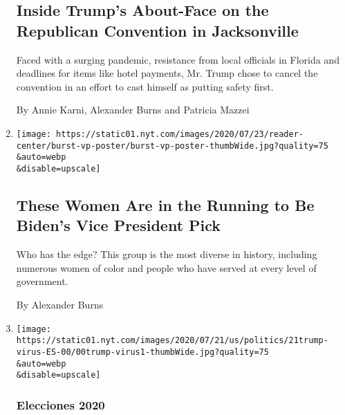 \begin{enumerate}
  \hypertarget{inside-trumps-about-face-on-the-republican-convention-in-jacksonville}{%
  \subsection{Inside Trump's About-Face on the Republican Convention in
  Jacksonville}\label{inside-trumps-about-face-on-the-republican-convention-in-jacksonville}}

  Faced with a surging pandemic, resistance from local officials in
  Florida and deadlines for items like hotel payments, Mr. Trump chose
  to cancel the convention in an effort to cast himself as putting
  safety first.

  By Annie Karni, Alexander Burns and Patricia Mazzei
\item
  \href{/interactive/2020/07/23/us/elections/vice-president-biden-kamala-harris-elizabeth-warren.html}{}

  \texttt{[image: https://static01.nyt.com/images/2020/07/23/reader-center/burst-vp-poster/burst-vp-poster-thumbWide.jpg?quality=75\\\&auto=webp\\\&disable=upscale]}

  \hypertarget{these-women-are-in-the-running-to-be-bidens-vice-president-pick}{%
  \subsection{These Women Are in the Running to Be Biden's Vice
  President
  Pick}\label{these-women-are-in-the-running-to-be-bidens-vice-president-pick}}

  Who has the edge? This group is the most diverse in history, including
  numerous women of color and people who have served at every level of
  government.

  By Alexander Burns
\item
  \href{/es/2020/07/21/espanol/estados-unidos/donald-trump-coronavirus-republicanos.html}{}

  \texttt{[image: https://static01.nyt.com/images/2020/07/21/us/politics/21trump-virus-ES-00/00trump-virus1-thumbWide.jpg?quality=75\\\&auto=webp\\\&disable=upscale]}

  \hypertarget{elecciones-2020-2}{%
  \subsubsection{Elecciones 2020}\label{elecciones-2020-2}}

  \hypertarget{trump-desestima-la-crisis-del-coronavirus-y-los-republicanos-empiezan-a-romper-filas}{%
}
\end{enumerate}
